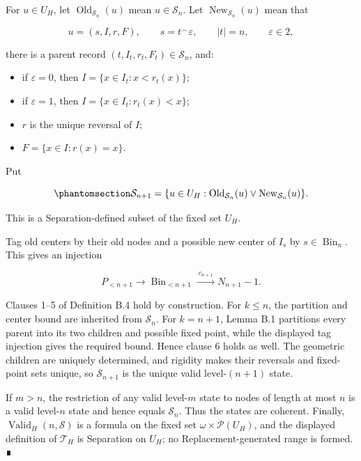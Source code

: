 \documentclass[
  english,
  11pt,
  reqno]{amsart}
\providecommand{\tightlist}{%
  \setlength{\itemsep}{0pt}\setlength{\parskip}{0pt}}
\begin{document}
For \(u\in U_H\), let \(\operatorname{Old}_{\mathcal S_n}(u)\) mean
\(u\in\mathcal S_n\). Let \(\operatorname{New}_{\mathcal S_n}(u)\) mean
that

\[
u=(s,I,r,F),
\qquad
s=t^\frown\varepsilon,
\qquad
|t|=n,
\qquad
\varepsilon\in2,
\]

there is a parent record \((t,I_t,r_t,F_t)\in\mathcal S_n\), and:

\begin{itemize}
\tightlist
\item
  if \(\varepsilon=0\), then \(I=\{x\in I_t:x<r_t(x)\}\);
\item
  if \(\varepsilon=1\), then \(I=\{x\in I_t:r_t(x)<x\}\);
\item
  \(r\) is the unique reversal of \(I\);
\item
  \(F=\{x\in I:r(x)=x\}\).
\end{itemize}

Put

\begin{equation}\protect\phantomsection\label{eq:typefree-successor-state}{
\mathcal S_{n+1}
=
\{u\in U_H:
\operatorname{Old}_{\mathcal S_n}(u)
\vee
\operatorname{New}_{\mathcal S_n}(u)\}.
}\end{equation}

This is a Separation-defined subset of the fixed set \(U_H\).

Tag old centers by their old nodes and a possible new center of \(I_s\)
by \(s\in\operatorname{Bin}_n\). This gives an injection

\[
P_{<n+1}\longrightarrow\operatorname{Bin}_{<n+1}\xrightarrow{\ c_{n+1}\ }N_{n+1}-1.
\]

Clauses 1--5 of Definition B.4 hold by construction. For \(k\le n\), the
partition and center bound are inherited from \(\mathcal S_n\). For
\(k=n+1\), Lemma B.1 partitions every parent into its two children and
possible fixed point, while the displayed tag injection gives the
required bound. Hence clause 6 holds as well. The geometric children are
uniquely determined, and rigidity makes their reversals and fixed-point
sets unique, so \(\mathcal S_{n+1}\) is the unique valid level-\((n+1)\)
state.

If \(m>n\), the restriction of any valid level-\(m\) state to nodes of
length at most \(n\) is a valid level-\(n\) state and hence equals
\(\mathcal S_n\). Thus the states are coherent. Finally,
\(\operatorname{Valid}_H(n,\mathcal S)\) is a formula on the fixed set
\(\omega\times\mathcal P(U_H)\), and the displayed definition of
\(\mathcal T_H\) is Separation on \(U_H\); no Replacement-generated
range is formed. ∎
\end{document}
